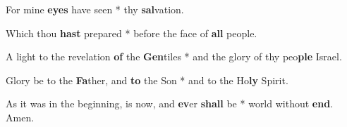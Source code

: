 \begin{multicols}{2}
	For mine \textbf{eyes} have seen * thy \textbf{sal}vation.
	
	Which thou \textbf{hast} prepared * before the face of \textbf{all} people.
	
	A light to the revelation \textbf{of} the \textbf{Gen}tiles * and the glory of thy peo\textbf{ple} Israel.
	
	Glory be to the \textbf{Fa}ther, and \textbf{to} the Son * and to the Ho\textbf{ly} Spirit.
	
	As it was in the beginning, is now, and \textbf{ev}er \textbf{shall} be * world without \textbf{end}. Amen.
\end{multicols}